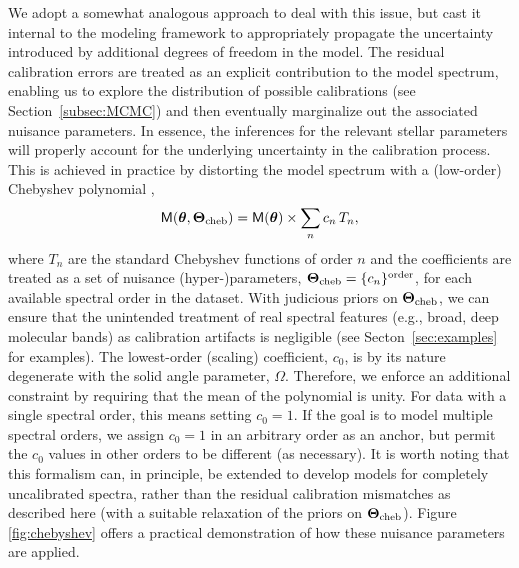\documentclass[iop,floatfix]{emulateapj}
\newcommand{\vt}{ {\bm \theta}}
\newcommand{\vT}{ {\bm \Theta}}
\newcommand{\vM}{\mathsf{M}}
\begin{document}
We adopt a somewhat analogous approach to deal with this issue, but cast it internal to the 
modeling framework to appropriately propagate the uncertainty introduced by additional degrees of 
freedom in the model.  The residual calibration errors are treated as an explicit contribution to 
the model spectrum, enabling us to explore the distribution of possible calibrations (see 
Section~\ref{subsec:MCMC}) and then eventually marginalize out the associated nuisance parameters.  
In essence, the inferences for the relevant stellar parameters will properly account for the 
underlying uncertainty in the calibration process.  This is achieved in practice by distorting the 
model spectrum with a (low-order) Chebyshev polynomial \citep[e.g.,][]{eisenstein06,koleva09}, 
\begin{equation}
\vM(\vt, \vT_{\rm cheb}) = \vM(\vt) \times \sum_n c_n \, T_n,
\end{equation}
where $T_n$ are the standard Chebyshev functions of order $n$ and the coefficients are treated as a
set of nuisance (hyper-)parameters, $\vT_{\rm cheb} = \{c_n\}^{\rm order}$, for each available 
spectral order in the dataset.  With judicious priors on $\vT_{\rm cheb}$, we can ensure that the 
unintended treatment of real spectral features (e.g., broad, deep molecular bands) as calibration 
artifacts is negligible (see Secton~\ref{sec:examples} for examples).  The lowest-order (scaling) 
coefficient, $c_0$, is by its nature degenerate with the solid angle parameter, $\Omega$.  
Therefore, we enforce an additional constraint by requiring that the mean of the polynomial is 
unity.  For data with a single spectral order, this means setting $c_0 = 1$.  If the goal is to 
model multiple spectral orders, we assign $c_0 = 1$ in an arbitrary order as an anchor, but permit 
the $c_0$ values in other orders to be different (as necessary).  It is worth noting that this 
formalism can, in principle, be extended to develop models for completely uncalibrated spectra, 
rather than the residual calibration mismatches as described here (with a suitable relaxation of 
the priors on $\vT_{\rm cheb}$).  Figure \ref{fig:chebyshev} offers a practical demonstration of how 
these nuisance parameters are applied. 
\end{document}
